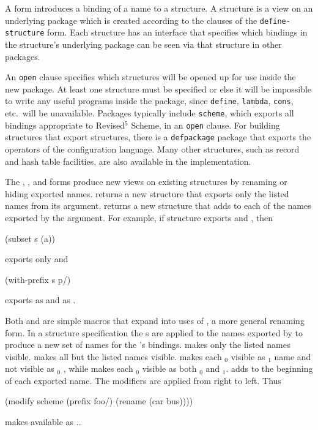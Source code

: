 \label{module-language-figure}

A  form introduces a binding of a name to a
structure.  A structure is a view on an underlying package which is
created according to the clauses of the {\tt define-structure} form.
Each structure has an interface that specifies which bindings in the
structure's underlying package can be seen via that structure in other
packages.

An {\tt open} clause specifies which structures will be opened up for
 use inside the new package.
At least one structure must be specified or else it will be impossible to
 write any useful programs inside the package, since {\tt define},
 {\tt lambda}, {\tt cons}, etc.\ will be unavailable.
Packages typically include {\tt scheme}, which exports all bindings
 appropriate to Revised$^5$ Scheme, in an {\tt open} clause.
For building structures that export structures, there is a {\tt defpackage}
 package that exports the operators of the configuration language.
Many other structures, such as record and hash table facilities, are also
 available in the \hack{} implementation.

The , , and
  forms produce new
 views on existing structures by renaming or hiding exported names.
 returns a new structure that exports only the listed names
 from its  argument.
 returns a new structure that adds 
 to each of the names exported by the  argument.
For example, if structure  exports  and ,
 then
\begin{example}
(subset s (a))
\end{example}
 exports only  and
\begin{example}
(with-prefix s p/)
\end{example}
exports  as  and  as .

Both  and  are simple macros that
 expand into uses of , a more general renaming form.
In a  structure specification the s are applied to
 the names exported
 by  to produce a new set of names for the 's
 bindings.
 makes only the listed names visible.
 makes all but the listed names visible.
 makes each $_0$ visible as $_1$ 
 name and not visible as $_0$ , while
  makes each $_0$ visible as both $_0$ 
 and $_1$.
 adds  to the beginning of each exported name.
The modifiers are applied from right to left.  Thus
\begin{example}
(modify scheme (prefix foo/) (rename (car bus))))
\end{example}
 makes  available as ..

